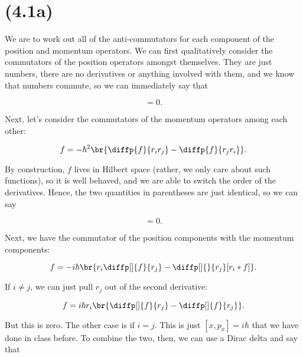 \section{(4.1a)}

\begin{parts}


\item We are to work out all of the anti-commutators for each component of the position and momentum operators. We can first qualitatively consider the commutators of the position operators amongst themselves. They are just numbers, there are no derivatives or anything involved with them, and we know that numbers commute, so we can immediately say that

\begin{equation}
    [r_i,r_j] = 0.
\end{equation}

Next, let's consider the commutators of the momentum operators among each other:

\begin{equation}
    [p_i,p_j]f = -\hbar^2 \br{\diffp{f}{{r_i}{r_j}} - \diffp{f}{{r_j}{r_i}}}.
\end{equation}

By construction, $f$ lives in Hilbert space (rather, we only care about such functions), so it is well behaved, and we are able to switch the order of the derivatives. Hence, the two quantities in parentheses are just identical, so we can say

\begin{equation}
    [p_i,p_j] = 0.
\end{equation}

Next, we have the commutator of the position components with the momentum components:

\begin{equation}
    [r_i,p_j]f = -i\hbar\br{r_i \diffp[]{f}{r_j} - \diffp[]{}{r_j}[r_i*f]}.
\end{equation}

If $i \neq j$, we can just pull $r_j$ out of the second derivative:

\begin{equation}
    [r_i,p_j]f = i\hbar r_i \br{\diffp[]{f}{r_j} - \diffp[]{f}{r_j}}.
\end{equation}

But this is zero. The other case is if $i=j$. This is just $[x,p_x] = i\hbar$ that we have done in class before. To combine the two, then, we can use a Dirac delta and say that


\end{parts}
